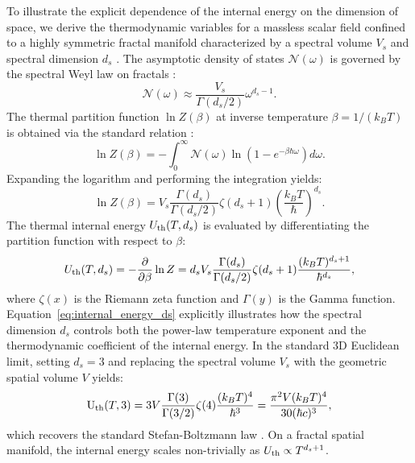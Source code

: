 \documentclass[12pt,letterpaper]{article}
\newcommand{\revision}[1]{#1}
\begin{document}
\revision{To illustrate the explicit dependence of the internal energy on the dimension of space, we derive the thermodynamic variables for a massless scalar field confined to a highly symmetric fractal manifold characterized by a spectral volume $V_s$ and spectral dimension $d_s$ \cite{akkermans2010}. The asymptotic density of states $\mathcal{N}(\omega)$ is governed by the spectral Weyl law on fractals \cite{akkermans2010,kajino2010}:
\begin{equation}
\mathcal{N}(\omega) \approx \frac{V_s}{\Gamma(d_s/2)} \omega^{d_s - 1}.
\label{eq:weyl_spectral_density}
\end{equation}
The thermal partition function $\ln Z(\beta)$ at inverse temperature $\beta = 1/(k_B T)$ is obtained via the standard relation \cite{akkermans2010}:
\begin{equation}
\ln Z(\beta) = -\int_{0}^{\infty} \mathcal{N}(\omega) \ln\left(1 - e^{-\beta \hbar \omega}\right) d\omega.
\label{eq:partition_integral_fractal}
\end{equation}
Expanding the logarithm and performing the integration yields:
\begin{equation}
\ln Z(\beta) = V_s \frac{\Gamma(d_s)}{\Gamma(d_s/2)} \zeta(d_s + 1) \left( \frac{k_B T}{\hbar} \right)^{d_s}.
\label{eq:partition_final_fractal}
\end{equation}
The thermal internal energy $U_{\rm th}(T, d_s)$ is evaluated by differentiating the partition function with respect to $\beta$:
\begin{equation}
U_{\rm th}(T, d_s) = -\frac{\partial}{\partial \beta} \ln Z = d_s V_s \frac{\Gamma(d_s)}{\Gamma(d_s/2)} \zeta(d_s + 1) \frac{(k_B T)^{d_s + 1}}{\hbar^{d_s}},
\label{eq:internal_energy_ds}
\end{equation}
where $\zeta(x)$ is the Riemann zeta function and $\Gamma(y)$ is the Gamma function. Equation~\eqref{eq:internal_energy_ds} explicitly illustrates how the spectral dimension $d_s$ controls both the power-law temperature exponent and the thermodynamic coefficient of the internal energy. In the standard 3D Euclidean limit, setting $d_s = 3$ and replacing the spectral volume $V_s$ with the geometric spatial volume $V$ yields:
\begin{equation}
\text{U}_{\rm th}(T, 3) = 3 V \frac{\Gamma(3)}{\Gamma(3/2)} \zeta(4) \frac{(k_B T)^4}{\hbar^3} = \frac{\pi^2 V (k_B T)^4}{30 (\hbar c)^3},
\label{eq:stefan_boltzmann_limit}
\end{equation}
which recovers the standard Stefan-Boltzmann law \cite{akkermans2010}. On a fractal spatial manifold, the internal energy scales non-trivially as $U_{\rm th} \propto T^{d_s + 1}$.}
\end{document}
